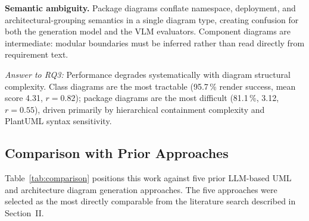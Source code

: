 \documentclass[conference]{IEEEtran}
\begin{document}
\textbf{Semantic ambiguity.} Package diagrams conflate namespace,
deployment, and architectural-grouping semantics in a single diagram
type, creating confusion for both the generation model and the VLM
evaluators. Component diagrams are intermediate: modular boundaries
must be inferred rather than read directly from requirement text.

\textit{Answer to RQ3:} Performance degrades systematically with
diagram structural complexity. Class diagrams are the most tractable
(95.7\,\% render success, mean score 4.31, $r = 0.82$); package
diagrams are the most difficult (81.1\,\%, 3.12, $r = 0.55$), driven
primarily by hierarchical containment complexity and PlantUML syntax
sensitivity.

\subsection{Comparison with Prior Approaches}

Table~\ref{tab:comparison} positions this work against five prior
LLM-based UML and architecture diagram generation approaches. The
five approaches were selected as the most directly comparable from
the literature search described in Section~II.
\end{document}
